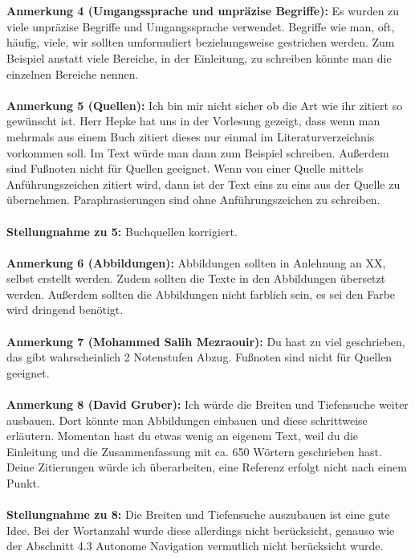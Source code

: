 \documentclass[a4paper,12pt]{book}
\begin{document}
\\\\
\textbf{Anmerkung 4 (Umgangssprache und unpräzise Begriffe):}
Es wurden zu viele unpräzise Begriffe und Umgangssprache verwendet. Begriffe wie \glqq man, oft, häufig, viele, wir\grqq{} sollten umformuliert beziehungsweise gestrichen werden. Zum Beispiel anstatt \glqq viele Bereiche\grqq{}, in der Einleitung, zu schreiben könnte man die einzelnen Bereiche nennen. 
\\ \\
\textbf{Anmerkung 5 (Quellen):}
Ich bin mir nicht sicher ob die Art wie ihr zitiert so gewünscht ist. Herr Hepke hat uns in der Vorlesung gezeigt, dass wenn man mehrmals aus einem Buch zitiert dieses nur einmal 
im Literaturverzeichnis vorkommen soll. Im Text würde man dann zum Beispiel  \glqq [RN10, 92-102]\grqq{} schreiben. Außerdem sind Fußnoten nicht für Quellen geeignet. 
Wenn von einer Quelle mittels Anführungszeichen zitiert wird, dann ist der Text eins zu eins aus der Quelle zu übernehmen. Paraphrasierungen sind ohne Anführungszeichen zu schreiben. 
\\ \\
\textbf{Stellungnahme zu 5:}
Buchquellen korrigiert.
\\ \\ 
\textbf{Anmerkung 6 (Abbildungen):}
Abbildungen sollten in Anlehnung an XX, selbst erstellt werden. Zudem sollten die Texte in den Abbildungen übersetzt werden.  
Außerdem sollten die Abbildungen nicht farblich sein, es sei den Farbe wird dringend benötigt.
\\ \\
\textbf{Anmerkung 7 (Mohammed Salih Mezraouir):}
Du hast zu viel geschrieben, das gibt wahrscheinlich 2 Notenstufen Abzug. Fußnoten sind nicht für Quellen geeignet.
\\ \\
\textbf{Anmerkung 8 (David Gruber):}
Ich würde die Breiten und Tiefensuche weiter ausbauen. Dort könnte man Abbildungen einbauen und diese schrittweise erläutern. Momentan hast du etwas wenig an eigenem Text, weil du die Einleitung und die Zusammenfassung mit ca. 650 Wörtern geschrieben hast. Deine Zitierungen würde ich überarbeiten, eine Referenz erfolgt nicht nach einem Punkt. 
\\ \\
\textbf{Stellungnahme zu 8:}
Die Breiten und Tiefensuche auszubauen ist eine gute Idee. Bei der Wortanzahl wurde diese allerdings nicht berücksicht, genauso wie der Abschnitt 4.3 Autonome Navigation vermutlich nicht berücksicht wurde.
\end{document}
